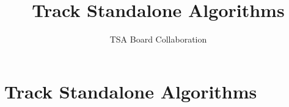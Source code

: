 \documentclass[12pt,a4paper]{article}
\author{TSA Board Collaboration}
\title{Track Standalone Algorithms}
\begin{document}
\section{Track Standalone Algorithms}




\end{document}

